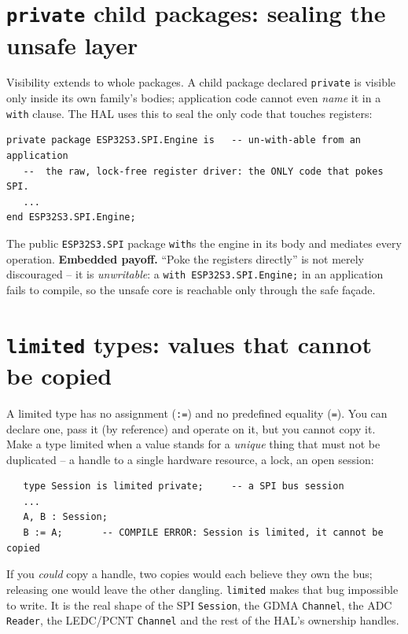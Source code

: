 \section{\texttt{private} child packages: sealing the unsafe layer}

Visibility extends to whole packages. A child package declared \texttt{private} is
visible only inside its own family's bodies; application code cannot even
\emph{name} it in a \texttt{with} clause. The HAL uses this to seal the only code
that touches registers:

\begin{lstlisting}
private package ESP32S3.SPI.Engine is   -- un-with-able from an application
   --  the raw, lock-free register driver: the ONLY code that pokes SPI.
   ...
end ESP32S3.SPI.Engine;
\end{lstlisting}

The public \texttt{ESP32S3.SPI} package \texttt{with}s the engine in its body and
mediates every operation. \textbf{Embedded payoff.} ``Poke the registers
directly'' is not merely discouraged -- it is \emph{unwritable}: a
\texttt{with ESP32S3.SPI.Engine;} in an application fails to compile, so the unsafe
core is reachable only through the safe fa\c{c}ade.

\section{\texttt{limited} types: values that cannot be copied}

A limited type has no assignment (\texttt{:=}) and no predefined equality
(\texttt{=}). You can declare one, pass it (by reference) and operate on it, but
you cannot copy it. Make a type limited when a value stands for a \emph{unique}
thing that must not be duplicated -- a handle to a single hardware resource, a
lock, an open session:

\begin{lstlisting}
   type Session is limited private;     -- a SPI bus session
   ...
   A, B : Session;
   B := A;       -- COMPILE ERROR: Session is limited, it cannot be copied
\end{lstlisting}

If you \emph{could} copy a handle, two copies would each believe they own the bus;
releasing one would leave the other dangling. \texttt{limited} makes that bug
impossible to write. It is the real shape of the SPI \texttt{Session}, the GDMA
\texttt{Channel}, the ADC \texttt{Reader}, the LEDC/PCNT \texttt{Channel} and the
rest of the HAL's ownership handles.

